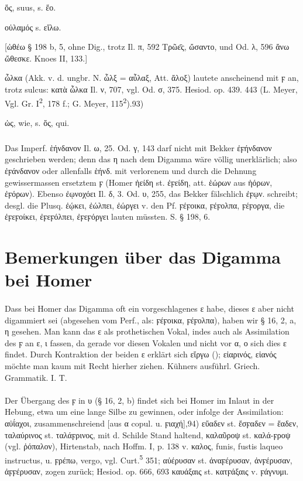 ὅς, suus, s. ἕο.

οὐλαμός s. εἴλω.

[ὠθέω § 198 b, 5, ohne Dig., trotz Il. π, 592 Τρῶε̄ς, ὤσαντο, und Od. λ, 596 ἄνω ὤθεσκε. Knoes II, 133.]

ὦλκα (Akk. v. d. ungbr. N. ὦλξ = αὖλαξ, Att. ἄλοξ) lautete anscheinend mit ϝ an, trotz sulcus: κατὰ ὦλκα Il. ν, 707, vgl. Od. σ, 375. Hesiod. op. 439. 443 (L. Meyer, Vgl. Gr. I\textsuperscript{2}, 178 f.; G. Meyer, 115\textsuperscript{2}).93)

ὡς, wie, s. ὅς, qui.

{\small\noindent\subparagraph{} Das Imperf. ἑήνδανον Il. ω, 25. Od. γ, 143 darf
nicht mit Bekker ἐϝήνδανον geschrieben werden; denn das η nach dem Digamma wäre
völlig unerklärlich; also ἐϝάνδανον oder allenfalls ἑήνδ. mit verlorenem und
durch die Dehnung gewissermassen ersetztem ϝ (Homer ἠείδη st. ἐϝείδη, att. ἑώρων
aus ἡόρων, ἐϝόρων). Ebenso ἐῳνοχόει Il. δ, 3. Od. υ, 255, das Bekker fälschlich
ἐϝῳν. schreibt; desgl. die Plusq. ἐῴκει, ἐώλπει, ἐώργει v. den Pf. ϝέϝοικα,
ϝέϝολπα, ϝέϝοργα, die ἐϝεϝοίκει, ἐϝεϝόλπει, ἐϝεϝόργει lauten müssten. S. § 198,
6.}

\section{Bemerkungen über das Digamma bei Homer}

\paragraph{} Dass bei Homer das Digamma oft ein vorgeschlagenes ε habe, dieses ε aber nicht digammiert sei (abgesehen vom Perf., als: ϝέϝοικα, ϝέϝολπα), haben wir § 16, 2, a, η gesehen. Man kann das ε als prothetischen Vokal, indes auch als Assimilation des ϝ an ε, ι fassen, da gerade vor diesen Vokalen und nicht vor α, ο sich dies ε findet. Durch Kontraktion der beiden ε erklärt sich εἴργω (); εἰαρινός, εἱανός möchte man kaum mit Recht hierher ziehen. Kühners ausführl. Griech. Grammatik. I. T.

\paragraph{} Der Übergang des ϝ in υ (§ 16, 2, b) findet sich bei Homer im Inlaut in der Hebung, etwa um eine lange Silbe zu gewinnen, oder infolge der Assimilation: αὐΐαχοι, zusammenschreiend [aus α copul. u. ϝιαχή],94) εὔαδεν st. ἔσϝαδεν = ἕαδεν, ταλαύρινος st. ταλάϝρινος, mit d. Schilde Stand haltend, καλαῦροψ st. καλά-ϝροψ (vgl. ῥόπαλον), Hirtenstab, nach Hoffm. I, p. 138 v. καλος, funis, fustis laqueo instructus, u. ϝρέπω, vergo, vgl. Curt.\textsuperscript{5} 351; αὐέρυσαν st. ἀναϝέρυσαν, ἀνϝέρυσαν, ἀϝϝέρυσαν, zogen zurück; Hesiod. op. 666, 693 καυάξαις st. κατϝάξαις v. ϝάγνυμι. 

